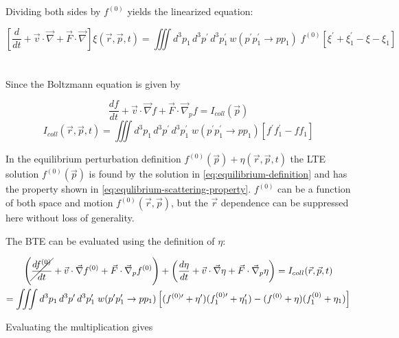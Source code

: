 \documentclass{template}
\begin{document}
Dividing both sides by $f^{(0)}$ yields the linearized equation:

\begin{equation}
\boxed{\left[\frac{d}{dt}   +   \vec{v}\cdot\vec{\nabla}   + \vec{F}\cdot\vec{\nabla}  \right] \xi(\vec{r}, \vec{p}, t) = \iiint  d^3p_1\, d^3p^\prime \, d^3p_1^\prime \, w(p^\prime p_1^\prime \rightarrow pp_1 )\; f^{(0)} \left[\xi^\prime + \xi^\prime_1 -\xi - \xi_1 \right]}   
\end{equation}


\section{}

Since the Boltzmann equation is given by

\begin{equation}
    \frac{df}{dt} + \vec{v}\cdot\vec{\nabla}f + \vec{F}\cdot\vec{\nabla}_p f = I_{coll}(\vec{p})
\end{equation}
\begin{equation}
    I_{coll}(\vec{r}, \vec{p},t) = \iiint d^3p_1\, d^3p^\prime \, d^3p_1^\prime \; w(p^\prime p_1^\prime \rightarrow pp_1 ) \left[ f^\prime f_1^\prime -  f f_1  \right]
\end{equation}


In the equilibrium perturbation definition $f^{(0)}(\vec{p}) +\eta(\vec{r}, \vec{p}, t)$ the LTE solution $f^{(0)}(\vec{p})$ is found by the solution in \autoref{eq:equilibrium-definition} and has the property shown in \autoref{eq:equlibrium-scattering-property}. $f^{(0)}$ can be a function of both space and motion $f^{(0)}(\vec{r}, \vec{p})$, but the $\vec{r}$ dependence can be suppressed here without loss of generality.

The BTE can be evaluated using the definition of $\eta$:

\begin{multline}
    \left(\cancel{\frac{df^{(0)}}{dt}} + \vec{v}\cdot\vec{\nabla}f^{(0)} + \vec{F}\cdot\vec{\nabla}_p f^{(0)}\right) + \left(\frac{d\eta}{dt} + \vec{v}\cdot\vec{\nabla}\eta + \vec{F}\cdot\vec{\nabla}_p \eta \right)= I_{coll}(\vec{r}, \vec{p},t) \\ 
    = \iiint d^3p_1\, d^3p^\prime \, d^3p_1^\prime \; w(p^\prime p_1^\prime \rightarrow pp_1 ) \left[ (f^{(0)\prime} +\eta^\prime)(f^{(0)\prime}_1 +\eta_1^\prime) -  (f^{(0)} +\eta)(f^{(0)}_1   +\eta_1)  \right]
\end{multline}

Evaluating the multiplication gives
\end{document}
